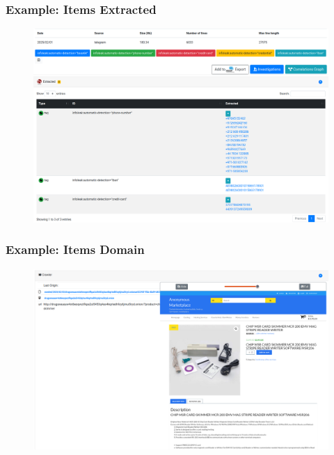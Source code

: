 \documentclass[aspectratio=169]{beamer}
\begin{document}
\begin{frame}
    \frametitle{Example: Items Extracted}
    \begin{figure}
        \includegraphics[scale=0.20, angle=0]{screenshot/item_meta.png}
    \end{figure}
\end{frame}

\begin{frame}
    \frametitle{Example: Items Domain}
    \begin{figure}
        \includegraphics[scale=0.22, angle=0]{screenshot/item_domain.png}
    \end{figure}
\end{frame}
\end{document}

